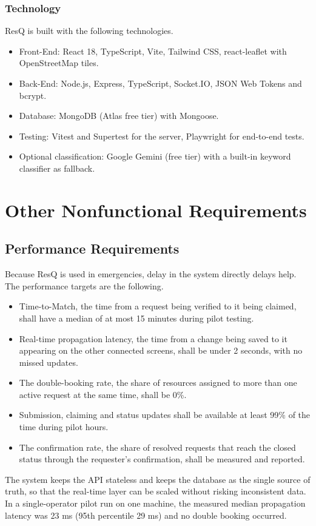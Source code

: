 \documentclass{scrreprt}
\newcounter{fr}
\begin{document}
\subsection*{Technology}
ResQ is built with the following technologies.
\begin{itemize}
    \item Front-End: React 18, TypeScript, Vite, Tailwind CSS, react-leaflet with OpenStreetMap tiles.
    \item Back-End: Node.js, Express, TypeScript, Socket.IO, JSON Web Tokens and bcrypt.
    \item Database: MongoDB (Atlas free tier) with Mongoose.
    \item Testing: Vitest and Supertest for the server, Playwright for end-to-end tests.
    \item Optional classification: Google Gemini (free tier) with a built-in keyword classifier as fallback.
\end{itemize}

\chapter{Other Nonfunctional Requirements}

\section{Performance Requirements}
Because ResQ is used in emergencies, delay in the system directly delays help. The performance targets are the following.
\begin{itemize}
    \item Time-to-Match, the time from a request being verified to it being claimed, shall have a median of at most 15 minutes during pilot testing.
    \item Real-time propagation latency, the time from a change being saved to it appearing on the other connected screens, shall be under 2 seconds, with no missed updates.
    \item The double-booking rate, the share of resources assigned to more than one active request at the same time, shall be 0\%.
    \item Submission, claiming and status updates shall be available at least 99\% of the time during pilot hours.
    \item The confirmation rate, the share of resolved requests that reach the closed status through the requester's confirmation, shall be measured and reported.
\end{itemize}
The system keeps the API stateless and keeps the database as the single source of truth, so that the real-time layer can be scaled without risking inconsistent data. In a single-operator pilot run on one machine, the measured median propagation latency was 23 ms (95th percentile 29 ms) and no double booking occurred.
\end{document}
